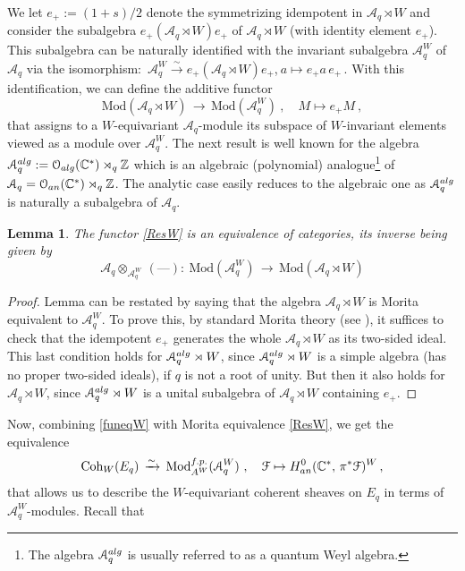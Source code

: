 \documentclass[11pt]{amsart}
\newtheorem{lemma}[theorem]{Lemma}
\theoremstyle{definition}
\theoremstyle{remark}
\numberwithin{equation}{section}
\newcommand{\la}{\label}
\def\c{\mathbb{C}}
\def\A{\mathcal{A}}
\def\Z{\mathbb{Z}}
\def\O{\mathcal{O}}
\def\Mod{\mathrm{Mod}}
\def\Coh{\mathrm{Coh}}
\def \cF{\mathcal{F}}
\begin{document}
%
We let $ e_+ := (1+s)/2 $ denote the symmetrizing idempotent 
in $ \A_q \rtimes W $ and consider the  subalgebra $ e_+ (\A_q \rtimes W) e_+  $ of $ \A_q \rtimes W $ (with identity element $e_+$). This subalgebra can be naturally identified with the invariant subalgebra $ \A_q^W $ of $ \A_q$ via the isomorphism:
$\, \A_q^{W} \xrightarrow{\sim} e_+ (\A_q \rtimes W) e_+ $,$\ a \mapsto e_+ a \,e_+\,$.
With this identification, we can define the additive functor
%
\begin{equation}
\la{ResW}
 \Mod(\A_q \rtimes W)\,\to\, \Mod(\A_q^W)\ ,\quad M \mapsto e_{+} M\ ,
\end{equation}
%
that assigns to a $W$-equivariant $\A_q$-module its subspace of $W$-invariant elements viewed as a module over $\A_q^W$. 
The next result is well known for the  algebra  $ \A_q^{\rm alg} := \O_{\rm alg}(\c^*) \rtimes_q \Z $ which is an algebraic (polynomial) analogue\footnote{The algebra $\A_q^{\rm alg}  $ is usually referred to as a quantum Weyl algebra.} of $ \A_q = \O_{\rm an}(\c^*)\rtimes_q \Z $. The analytic case easily reduces to the algebraic one as $ \A_q^{\rm alg}  $ is naturally a subalgebra of $\A_q  $.
%
\begin{lemma}
 \la{weylalg}
The functor \eqref{ResW} is an equivalence of categories, its inverse being given by
%
$$
\A_q \otimes_{\A_q^{W}}\,(\mbox{---}):\ \Mod(\A_q^W)\, \to\, \Mod(\A_q \rtimes W)
$$
\end{lemma}
%
\begin{proof}
Lemma can be restated by saying that the algebra $ \A_q\rtimes W$ is Morita equivalent to $\A_q^W $. To prove this, by standard Morita theory (see \cite[3.5.6]{MR01}), it suffices to
check that the idempotent $ e_+ $ generates the whole $ \A_q \rtimes W $ as its two-sided ideal.
This last condition holds for $\A_q^{\rm alg} \rtimes W $, since $\A_q^{\rm alg} \rtimes W $
is a simple algebra (has no proper two-sided ideals), if $q$ is not a root of unity. But then
it also holds for $ \A_q \rtimes W $, since $ \A_q^{\rm alg} \rtimes W $ is a unital
subalgebra of $ \A_q \rtimes W $ containing $e_+$.
\end{proof}
%
Now, combining \eqref{funeqW} with Morita equivalence \eqref{ResW}, we get the equivalence
%
\begin{equation}
\la{funeq2}
\Coh_W(E_q)\,\xrightarrow{\sim}\,\Mod^{\rm f.p.}_{A^W}(\A_q^W)\ ,\quad \cF \mapsto 
H^0_{\rm an}(\c^*, \,\pi^* \cF)^{W}\,,
\end{equation}
%
that allows us to describe the $W$-equivariant coherent
sheaves on $E_q$ in terms of $\A_q^W$-modules. Recall that
\end{document}
